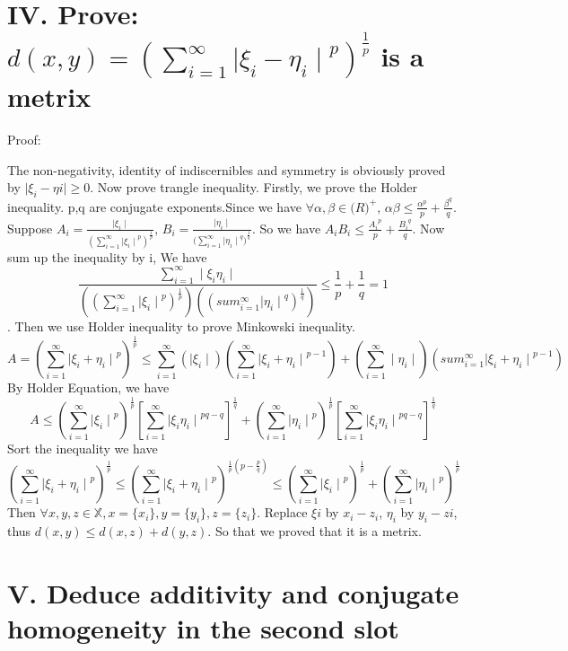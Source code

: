 \documentclass[twoside,a4paper]{article}
\begin{document}
\section*{IV. \small{Prove: $d(x,y) = (\sum_{i=1}^{\infty}{\mid\xi_{i} - \eta_{i}\mid}^{p})^{\frac{1}{p}}$ is a metrix}}

Proof:

The non-negativity, identity of indiscernibles and symmetry is obviously proved by $\mid\xi_{i} - \eta{i}\mid \geq 0$.
Now prove trangle inequality.
Firstly, we prove the Holder inequality.
p,q are conjugate exponents.Since we have $\forall \alpha,\beta \in \mathbb(R)^+$, $\alpha\beta \leq \frac{\alpha^p}{p} + \frac{\beta^q}{q}$.
Suppose $A_{i} = \frac{\mid\xi_{i}\mid}{(\sum_{i=1}^{\infty}{{\mid\xi_{i}\mid}^p})^{\frac{1}{p}}}$, $B_{i} = \frac{\mid\eta_{i}\mid}{(\sum_{i=1}^{\infty}{{\mid\eta_{i}\mid}^q)}^{\frac{1}{q}}}$. 
So we have $A_{i}B_{i} \leq \frac{{A_{i}}^p}{p} + \frac{{B_{i}}^q}{q}$. Now sum up the inequality by i, We have 
$$\frac{\sum_{i=1}^{\infty}\mid\xi_{i}\eta_{i}\mid}{({(\sum_{i=1}^{\infty}{{\mid\xi_{i}\mid}^{p}})}^{\frac{1}{p}})
({({sum_{i=1}^{\infty}{\mid\eta_{i}\mid}^q})}^{\frac{1}{q}})} \leq \frac{1}{p} + \frac{1}{q} = 1$$.
Then we use Holder inequality to prove Minkowski inequality.
$$A = (\sum_{i=1}^{\infty}{\mid\xi_{i} + \eta_{i}\mid}^{p})^{\frac{1}{p}} \leq \sum_{i=1}^{\infty}({\mid\xi_{i}\mid})
(\sum_{i=1}^{\infty}{\mid\xi_{i} + \eta_{i}\mid}^{p-1}) + (\sum_{i=1}^{\infty}\mid\eta_{i}\mid)(sum_{i=1}^{\infty}{\mid\xi_{i} + \eta_{i}\mid}^{p-1})$$
By Holder Equation, we have 
$$A \leq (\sum_{i=1}^{\infty}{\mid\xi_{i}\mid}^{p})^{\frac{1}{p}}[\sum_{i=1}^{\infty}{\mid\xi_{i}\eta_{i}\mid}^{pq-q}]^{\frac{1}{q}} +
(\sum_{i=1}^{\infty}{\mid\eta_{i}\mid}^{p})^{\frac{1}{p}}
[\sum_{i=1}^{\infty}{\mid\xi_{i}\eta_{i}\mid}^{pq-q}]^{\frac{1}{q}}$$
Sort the inequality we have 
$$(\sum_{i=1}^{\infty}{\mid\xi_{i} + \eta_{i}\mid}^{p})^{\frac{1}{p}} \leq (\sum_{i=1}^{\infty}{\mid\xi_{i} + 
\eta_{i}\mid}^{p})^{\frac{1}{p}(p - \frac{p}{q})} \leq (\sum_{i=1}^{\infty}{\mid\xi_{i}\mid}^{p})^{\frac{1}{p}}+
(\sum_{i=1}^{\infty}{\mid\eta_{i}\mid}^{p})^{\frac{1}{p}}$$
Then $\forall x,y,z \in \mathbb{X}, x=\{x_{i}\}, y=\{y_{i}\}, z=\{z_{i}\}$.
Replace $\xi{i}$ by $x_{i} - z_{i}$, $\eta_{i}$ by $y_{i} - z{i}$, thus $d(x,y) \leq d(x,z) + d(y,z)$.
So that we proved that it is a metrix.

\section*{V. \small{Deduce additivity and conjugate homogeneity in the second slot}}
\end{document}
